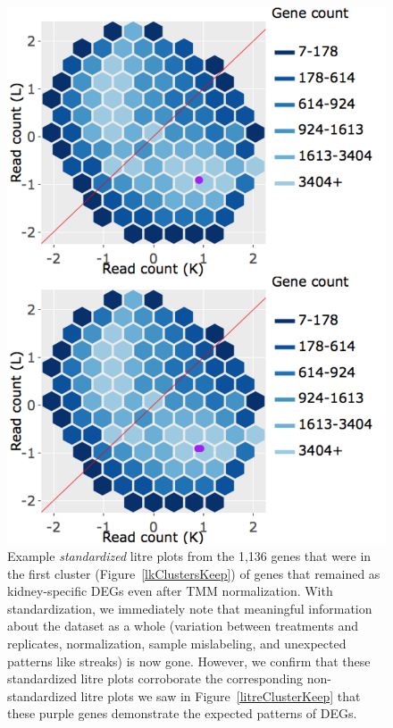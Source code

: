 \documentclass{article}
\begin{document}
  \null
  \begin{figure}[t!]
  \centerline{\includegraphics[width=0.7\columnwidth]{../MakeFigures/Dashboards/litreClusterKeep-St/litreClusterKeep-St.jpg}}
  \caption{Example \textit{standardized} litre plots from the 1,136 genes that were in the first cluster (Figure~\ref{lkClustersKeep}) of genes that remained as kidney-specific DEGs even after TMM normalization. With standardization, we immediately note that meaningful information about the dataset as a whole (variation between treatments and replicates, normalization, sample mislabeling, and unexpected patterns like streaks) is now gone. However, we confirm that these standardized litre plots corroborate the corresponding non-standardized litre plots we saw in Figure~\ref{litreClusterKeep} that these purple genes demonstrate the expected patterns of DEGs.
  \label{litreClusterKeep-St}}
  \end{figure}
  
\end{document}
